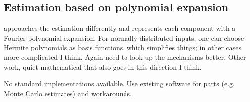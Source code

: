 \subsection*{Estimation based on polynomial expansion}
\cite{rahman2014} approaches the estimation differently and represents each component with a Fourier polynomial expansion. For normally distributed inputs, one can choose Hermite polynomials as basis functions, which simplifies things; in other cases more complicated I think.
Again need to look up the mechanisms better.
Other work, quiet mathematical that also goes in this direction I think.

No standard implementations available. Use existing software for parts (e.g. Monte Carlo estimates) and workarounds.